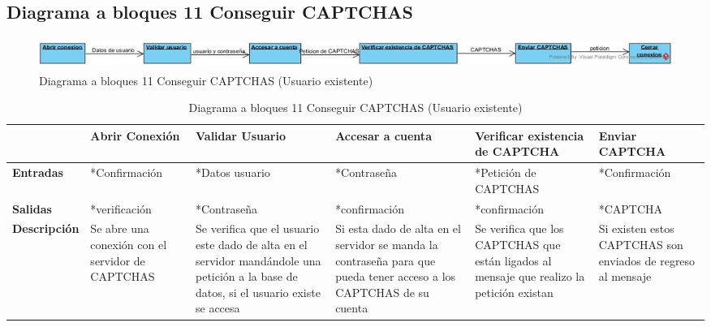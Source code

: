 \subsection{Diagrama a bloques 11 Conseguir CAPTCHAS}
\begin{figure}[H]
	\includegraphics[width=1\linewidth, height=1cm]{./images/bloques11.jpg}
	\caption{Diagrama a bloques 11 Conseguir CAPTCHAS (Usuario existente)}
	\label{fig:5-11-1}
\end{figure}
\begin{table}[H]
 \centering
   {
     \begin{tabular}{| p{} | p{3cm} | p{2cm} | p{2cm} | p{3cm} | p{3cm} |}
     \hline
     & \textbf{Abrir Conexión} & \textbf{Validar Usuario} & \textbf{Accesar a cuenta} & \textbf{Verificar existencia de CAPTCHA} & \textbf{Enviar CAPTCHA}\\
     \hline
     \textbf{Entradas} & *Confirmación & *Datos usuario & *Contraseña & *Petición de CAPTCHAS & *Confirmación\\
     \hline
     \textbf{Salidas} & *verificación & *Contraseña & *confirmación & *confirmación & *CAPTCHA\\
     \hline
     \textbf{Descripción} & Se abre una conexión con el servidor de CAPTCHAS & Se verifica que el usuario este dado de alta en el servidor mandándole una petición a la base de datos, si el usuario existe se accesa & Si esta dado de alta en el servidor se manda la contraseña para que pueda tener acceso a los CAPTCHAS de su cuenta & Se verifica que los CAPTCHAS que están ligados al mensaje que realizo la petición existan & Si existen estos CAPTCHAS son enviados de regreso al mensaje\\
	\hline
    \end{tabular}
    }
    \caption{Diagrama a bloques 11 Conseguir CAPTCHAS (Usuario existente)}
    \label{tabla:b11}
\end{table}

